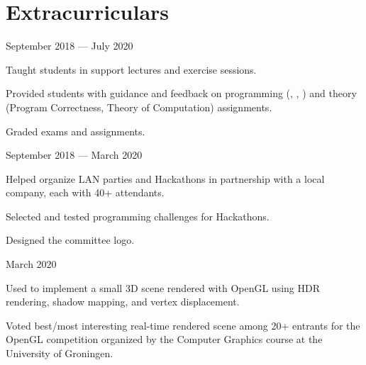 \section*{Extracurriculars}

\begin{cventries}
  {September 2018 --- July 2020} %
  {%
    \begin{cvitems}
    \item Taught students in support lectures and exercise sessions.
    \item Provided students with guidance and feedback on programming (, , ) and theory\\ (Program Correctness, Theory of Computation) assignments.
    \item Graded exams and assignments.
    \end{cvitems}
  }
  {September 2018 --- March 2020}
  {%
    \begin{cvitems}
      \item Helped organize LAN parties and Hackathons in partnership with a local company, each with 40+ attendants.
      \item Selected and tested programming challenges for Hackathons.
      \item Designed the committee logo.
    \end{cvitems}
  }
  {March 2020}
  {%
    \begin{cvitems}
      \item Used  to implement a small 3D scene rendered with OpenGL using HDR rendering, shadow mapping, and vertex displacement.  \textbf{}
      \item Voted best/most interesting real-time rendered scene among 20+ entrants for the OpenGL competition organized by the Computer Graphics course at the University of Groningen.
    \end{cvitems}
  }
\end{cventries}


